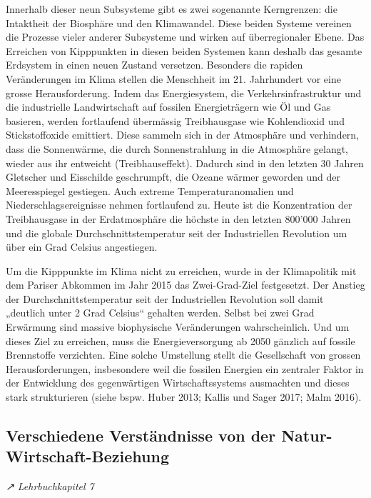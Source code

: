 \documentclass[
  nswissgerman,
  a4paper,
  DIV=11,
  numbers=noendperiod,
  oneside,
  openany]{scrreprt}
\begin{document}
Innerhalb dieser neun Subsysteme gibt es zwei sogenannte Kerngrenzen:
die Intaktheit der Biosphäre und den Klimawandel. Diese beiden Systeme
vereinen die Prozesse vieler anderer Subsysteme und wirken auf
überregionaler Ebene. Das Erreichen von Kipppunkten in diesen beiden
Systemen kann deshalb das gesamte Erdsystem in einen neuen Zustand
versetzen. Besonders die rapiden Veränderungen im Klima stellen die
Menschheit im 21. Jahrhundert vor eine grosse Herausforderung. Indem das
Energiesystem, die Verkehrsinfrastruktur und die industrielle
Landwirtschaft auf fossilen Energieträgern wie Öl und Gas basieren,
werden fortlaufend übermässig Treibhausgase wie Kohlendioxid und
Stickstoffoxide emittiert. Diese sammeln sich in der Atmosphäre und
verhindern, dass die Sonnenwärme, die durch Sonnenstrahlung in die
Atmosphäre gelangt, wieder aus ihr entweicht (Treibhauseffekt). Dadurch
sind in den letzten 30 Jahren Gletscher und Eisschilde geschrumpft, die
Ozeane wärmer geworden und der Meeresspiegel gestiegen. Auch extreme
Temperaturanomalien und Niederschlagsereignisse nehmen fortlaufend zu.
Heute ist die Konzentration der Treibhausgase in der Erdatmosphäre die
höchste in den letzten 800'000 Jahren und die globale
Durchschnittstemperatur seit der Industriellen Revolution um über ein
Grad Celsius angestiegen.

Um die Kipppunkte im Klima nicht zu erreichen, wurde in der Klimapolitik
mit dem Pariser Abkommen im Jahr 2015 das Zwei-Grad-Ziel festgesetzt.
Der Anstieg der Durchschnittstemperatur seit der Industriellen
Revolution soll damit „deutlich unter 2 Grad Celsius`` gehalten werden.
Selbst bei zwei Grad Erwärmung sind massive biophysische Veränderungen
wahrscheinlich. Und um dieses Ziel zu erreichen, muss die
Energieversorgung ab 2050 gänzlich auf fossile Brennstoffe verzichten.
Eine solche Umstellung stellt die Gesellschaft von grossen
Herausforderungen, insbesondere weil die fossilen Energien ein zentraler
Faktor in der Entwicklung des gegenwärtigen Wirtschaftssystems
ausmachten und dieses stark strukturieren (siehe bspw. Huber 2013;
Kallis und Sager 2017; Malm 2016).

\subsection{Verschiedene Verständnisse von der
Natur-Wirtschaft-Beziehung}\label{verschiedene-verstuxe4ndnisse-von-der-natur-wirtschaft-beziehung}

\emph{↗ Lehrbuchkapitel 7}
\end{document}
